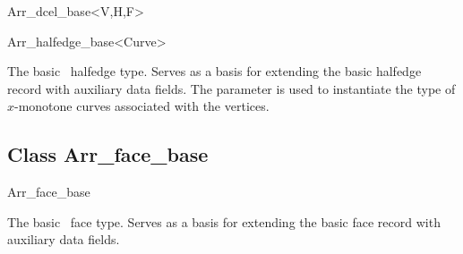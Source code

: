 \begin{ccRefClass}{Arr_dcel_base<V,H,F>}
\begin{ccClass}{Arr_halfedge_base<Curve>}
\ccDefinition

The basic \dcel\ halfedge type. Serves as a basis for extending the basic
halfedge record with auxiliary data fields. The  parameter is used
to instantiate the type of $x$-monotone curves associated with the vertices.

\ccIsModel

\end{ccClass}


\subsection*{Class Arr\_face\_base}

\begin{ccClass}{Arr_face_base}

\ccDefinition

The basic \dcel\ face type. Serves as a basis for extending the basic
face record with auxiliary data fields.

\ccIsModel

\end{ccClass}


\end{ccRefClass}

\ccRefPageEnd
